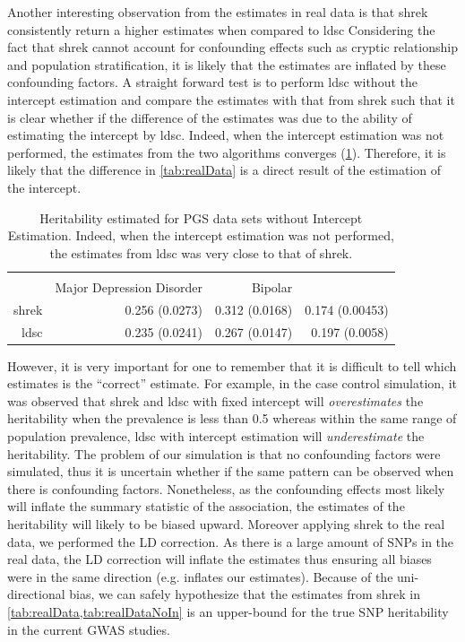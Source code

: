 \documentclass[12pt]{scrbook}
\newcommand*{\Glng}{\Glsentrylong}
\begin{document}
Another interesting observation from the estimates in real data is that \gls{shrek} consistently return a higher estimates when compared to \gls{ldsc}
Considering the fact that \gls{shrek} cannot account for confounding effects such as cryptic relationship and population stratification, it is likely that the estimates are inflated by these confounding factors.
A straight forward test is to perform \gls{ldsc} without the intercept estimation and compare the estimates with that from \gls{shrek} such that it is clear whether if the difference of the estimates was due to the ability of estimating the intercept by \gls{ldsc}.
Indeed, when the intercept estimation was not performed, the estimates from the two algorithms converges (\cref{tab:realDataNoIn}).
Therefore, it is likely that the difference in \cref{tab:realData} is a direct result of the estimation of the intercept.
\begin{table}
	\centering
	\begin{tabular}{rrrr}
		\toprule
		\\
		& Major Depression Disorder & Bipolar & \Glng{scz}\\
		\midrule
		\gls{shrek}   & 0.256 (0.0273)  & 0.312 (0.0168)  & 0.174 (0.00453) \\
		\gls{ldsc}   & 0.235 (0.0241) & 0.267 (0.0147) & 0.197 (0.0058)\\
		\bottomrule
	\end{tabular}
	\caption[Heritability Estimated for PGC Data Sets without Intercept Estimation]{			
		Heritability estimated for \gls{PGS} data sets without Intercept Estimation.
		Indeed, when the intercept estimation was not performed, the estimates from \gls{ldsc} was very close to that of \gls{shrek}. 
	}
	\label{tab:realDataNoIn}
\end{table}

However, it is very important for one to remember that it is difficult to tell which estimates is the ``correct'' estimate.
For example, in the case control simulation, it was observed that \gls{shrek} and \gls{ldsc} with fixed intercept will \emph{overestimates} the heritability when the prevalence is less than 0.5 whereas within the same range of population prevalence, \gls{ldsc} with intercept estimation will \emph{underestimate} the heritability.
The problem of our simulation is that no confounding factors were simulated, thus it is uncertain whether if the same pattern can be observed when there is confounding factors.
Nonetheless, as the confounding effects most likely will inflate the summary statistic of the association, the estimates of the heritability will likely to be biased upward.
Moreover applying \gls{shrek} to the real data, we performed the \gls{LD} correction.
As there is a large amount of \glspl{SNP} in the real data, the \gls{LD} correction will inflate the estimates thus ensuring all biases were in the same direction (e.g. inflates our estimates).
Because of the uni-directional bias, we can safely hypothesize that the estimates from \gls{shrek} in \cref{tab:realData,tab:realDataNoIn} is an upper-bound for the true \gls{SNP} heritability in the current \gls{GWAS} studies.
\end{document}
